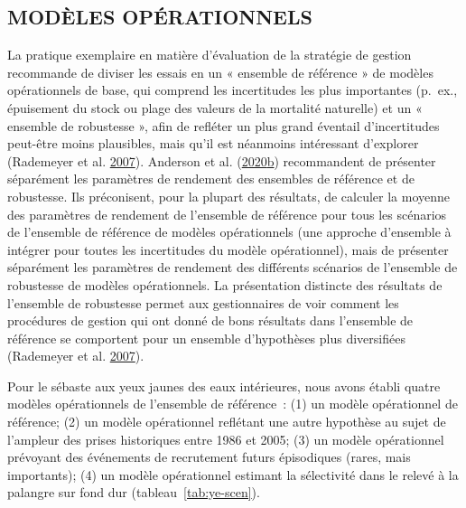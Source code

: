 \documentclass[french,11pt]{book}
\begin{document}
\hypertarget{sec:approach3-oms}{%
\subsection{MODÈLES OPÉRATIONNELS}\label{sec:approach3-oms}}

La pratique exemplaire en matière d'évaluation de la stratégie de gestion recommande de diviser les essais en un « ensemble de référence » de modèles opérationnels de base, qui comprend les incertitudes les plus importantes (p.~ex., épuisement du stock ou plage des valeurs de la mortalité naturelle) et un « ensemble de robustesse », afin de refléter un plus grand éventail d'incertitudes peut-être moins plausibles, mais qu'il est néanmoins intéressant d'explorer (Rademeyer et al. \protect\hyperlink{ref-rademeyer2007}{2007}). Anderson et al. (\protect\hyperlink{ref-anderson2020gfmp}{2020}\protect\hyperlink{ref-anderson2020gfmp}{b}) recommandent de présenter séparément les paramètres de rendement des ensembles de référence et de robustesse. Ils préconisent, pour la plupart des résultats, de calculer la moyenne des paramètres de rendement de l'ensemble de référence pour tous les scénarios de l'ensemble de référence de modèles opérationnels (une approche d'ensemble à intégrer pour toutes les incertitudes du modèle opérationnel), mais de présenter séparément les paramètres de rendement des différents scénarios de l'ensemble de robustesse de modèles opérationnels. La présentation distincte des résultats de l'ensemble de robustesse permet aux gestionnaires de voir comment les procédures de gestion qui ont donné de bons résultats dans l'ensemble de référence se comportent pour un ensemble d'hypothèses plus diversifiées (Rademeyer et al. \protect\hyperlink{ref-rademeyer2007}{2007}).

Pour le sébaste aux yeux jaunes des eaux intérieures, nous avons établi quatre modèles opérationnels de l'ensemble de référence~: (1) un modèle opérationnel de référence; (2) un modèle opérationnel reflétant une autre hypothèse au sujet de l'ampleur des prises historiques entre 1986 et 2005; (3) un modèle opérationnel prévoyant des événements de recrutement futurs épisodiques (rares, mais importants); (4) un modèle opérationnel estimant la sélectivité dans le relevé à la palangre sur fond dur (tableau~\ref{tab:ye-scen}).
\end{document}
